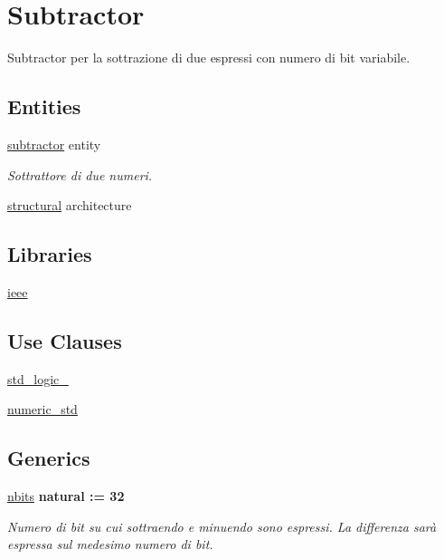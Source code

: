 \hypertarget{group___subtractor}{\section{Subtractor}
\label{group___subtractor}
}


Subtractor per la sottrazione di due espressi con numero di bit variabile.  


\subsection*{Entities}
\begin{DoxyCompactItemize}
\item 
\hyperlink{classsubtractor}{subtractor} entity
\begin{DoxyCompactList}\small\item\em Sottrattore di due numeri. \end{DoxyCompactList}\item 
\hyperlink{classsubtractor_1_1structural}{structural} architecture
\end{DoxyCompactItemize}
\subsection*{Libraries}
 \begin{DoxyCompactItemize}
\item 
\hyperlink{group___subtractor_ga0a6af6eef40212dbaf130d57ce711256}{ieee} 
\end{DoxyCompactItemize}
\subsection*{Use Clauses}
 \begin{DoxyCompactItemize}
\item 
\hyperlink{group___subtractor_gacd03516902501cd1c7296a98e22c6fcb}{std\+\_\+logic\+\_}   
\item 
\hyperlink{group___subtractor_ga2edc34402b573437d5f25fa90ba4013e}{numeric\+\_\+std}   
\end{DoxyCompactItemize}
\subsection*{Generics}
 \begin{DoxyCompactItemize}
\item 
\hyperlink{group___subtractor_gae1435c07d0cd54b521535e2f8de6f94e}{nbits} {\bfseries {\bfseries \textcolor{vhdlchar}{natural}\textcolor{vhdlchar}{ }\textcolor{vhdlchar}{ }\textcolor{vhdlchar}{\+:}\textcolor{vhdlchar}{=}\textcolor{vhdlchar}{ }\textcolor{vhdlchar}{ } \textcolor{vhdldigit}{32} \textcolor{vhdlchar}{ }}}
\begin{DoxyCompactList}\small\item\em Numero di bit su cui sottraendo e minuendo sono espressi. La differenza sarà espressa sul medesimo numero di bit. \end{DoxyCompactList}\end{DoxyCompactItemize}
